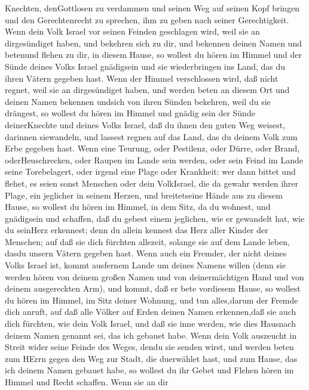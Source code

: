 Knechten, denGottlosen zu verdammen und seinen Weg auf seinen Kopf
bringen und den Gerechtenrecht zu sprechen, ihm zu geben nach seiner
Gerechtigkeit.  Wenn dein Volk Israel vor seinen Feinden
geschlagen wird, weil sie an dirgesündiget haben, und bekehren sich zu
dir, und bekennen deinen Namen und betenund flehen zu dir, in diesem
Hause,  so wollest du hören im Himmel und der Sünde deines
Volks Israel gnädigsein und sie wiederbringen ins Land, das du ihren
Vätern gegeben hast.  Wenn der Himmel verschlossen wird,
daß nicht regnet, weil sie an dirgesündiget haben, und werden beten an
diesem Ort und deinen Namen bekennen undsich von ihren Sünden bekehren,
weil du sie drängest,  so wollest du hören im Himmel und
gnädig sein der Sünde deinerKnechte und deines Volks Israel, daß du
ihnen den guten Weg weisest, darinnen siewandeln, und lassest regnen auf
das Land, das du deinem Volk zum Erbe gegeben hast.  Wenn
eine Teurung, oder Pestilenz, oder Dürre, oder Brand, oderHeuschrecken,
oder Raupen im Lande sein werden, oder sein Feind im Lande seine
Torebelagert, oder irgend eine Plage oder Krankheit:  wer
dann bittet und flehet, es seien sonst Menschen oder dein VolkIsrael,
die da gewahr werden ihrer Plage, ein jeglicher in seinem Herzen, und
breitetseine Hände aus zu diesem Hause,  so wollest du
hören im Himmel, in dem Sitz, da du wohnest, und gnädigsein und
schaffen, daß du gebest einem jeglichen, wie er gewandelt hat, wie du
seinHerz erkennest; denn du allein kennest das Herz aller Kinder der
Menschen;  auf daß sie dich fürchten allezeit, solange sie
auf dem Lande leben, dasdu unsern Vätern gegeben hast. 
Wenn auch ein Fremder, der nicht deines Volks Israel ist, kommt
ausfernem Lande um deines Namens willen  (denn sie werden
hören von deinem großen Namen und von deinermächtigen Hand und von
deinem ausgereckten Arm), und kommt, daß er bete vordiesem Hause,
 so wollest du hören im Himmel, im Sitz deiner Wohnung, und
tun alles,darum der Fremde dich anruft, auf daß alle Völker auf Erden
deinen Namen erkennen,daß sie auch dich fürchten, wie dein Volk Israel,
und daß sie inne werden, wie dies Hausnach deinem Namen genannt sei, das
ich gebauet habe.  Wenn dein Volk auszeucht in Streit wider
seine Feinde des Weges, dendu sie senden wirst, und werden beten zum
HErrn gegen den Weg zur Stadt, die duerwählet hast, und zum Hause, das
ich deinem Namen gebauet habe,  so wollest du ihr Gebet und
Flehen hören im Himmel und Recht schaffen.  Wenn sie an dir
